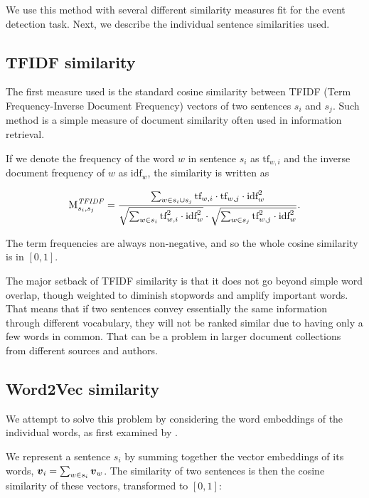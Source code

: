 We use this method with several different similarity measures fit for the event detection task. Next, we describe the individual sentence similarities used.

\subsection{TFIDF similarity}

The first measure used is the standard cosine similarity between TFIDF (Term Frequency-Inverse Document Frequency) vectors \citep{information-retrieval} of two sentences $s_{i}$ and $s_{j}$. Such method is a simple measure of document similarity often used in information retrieval.

If we denote the frequency of the word $w$ in sentence $s_{i}$ as $\text{tf}_{w,i}$ and the inverse document frequency of $w$ as $\text{idf}_{w}$, the similarity is written as

\begin{equation}
	\text{M}_{s_{i}, s_{j}}^{\mathit{TFIDF}} = \frac{\sum_{w \in s_{i} \cup s_{j}} \text{tf}_{w,i} \cdot \text{tf}_{w,j} \cdot \text{idf}_{w}^{2}}{\sqrt{\sum_{w \in s_{i}} \text{tf}_{w, i}^{2} \cdot \text{idf}_{w}^{2}} \cdot \sqrt{\sum_{w \in s_{j}} \text{tf}_{w, j}^{2} \cdot \text{idf}_{w}^{2}}}.
\end{equation}

The term frequencies are always non-negative, and so the whole cosine similarity is in $[0, 1]$.

The major setback of TFIDF similarity is that it does not go beyond simple word overlap, though weighted to diminish stopwords and amplify important words. That means that if two sentences convey essentially the same information through different vocabulary, they will not be ranked similar due to having only a few words in common. That can be a problem in larger document collections from different sources and authors.

\subsection{Word2Vec similarity}

We attempt to solve this problem by considering the word embeddings of the individual words, as first examined by \cite{mogren-1}.

We represent a sentence $s_{i}$ by summing together the vector embeddings of its words, $\embed_{i} = \sum_{w \in s_{i}} \embed_{w}$. The similarity of two sentences is then the cosine similarity of these vectors, transformed to $[0, 1]$:


